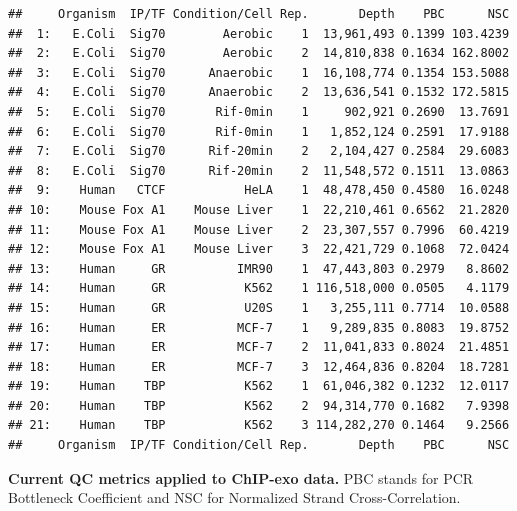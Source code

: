 \documentclass{bmcart}\usepackage[]{graphicx}\usepackage[]{color}
\makeatletter
\newenvironment{kframe}{%
 \def\at@end@of@kframe{}%
 \ifinner\ifhmode%
  \def\at@end@of@kframe{\end{minipage}}%
  \begin{minipage}{\columnwidth}%
 \fi\fi%
 \def\FrameCommand##1{\hskip\@totalleftmargin \hskip-\fboxsep
 \colorbox{shadecolor}{##1}\hskip-\fboxsep
     \hskip-\linewidth \hskip-\@totalleftmargin \hskip\columnwidth}%
 \MakeFramed {\advance\hsize-\width
   \@totalleftmargin\z@ \linewidth\hsize
   \@setminipage}}%
 {\par\unskip\endMakeFramed%
 \at@end@of@kframe}
\newenvironment{knitrout}{}{} %
\makeatother
\begin{document}
\begin{table}[h!]
  \centering


\begin{knitrout}
\color{fgcolor}\begin{kframe}
\begin{verbatim}
##     Organism  IP/TF Condition/Cell Rep.       Depth    PBC      NSC
##  1:   E.Coli  Sig70        Aerobic    1  13,961,493 0.1399 103.4239
##  2:   E.Coli  Sig70        Aerobic    2  14,810,838 0.1634 162.8002
##  3:   E.Coli  Sig70      Anaerobic    1  16,108,774 0.1354 153.5088
##  4:   E.Coli  Sig70      Anaerobic    2  13,636,541 0.1532 172.5815
##  5:   E.Coli  Sig70       Rif-0min    1     902,921 0.2690  13.7691
##  6:   E.Coli  Sig70       Rif-0min    1   1,852,124 0.2591  17.9188
##  7:   E.Coli  Sig70      Rif-20min    2   2,104,427 0.2584  29.6083
##  8:   E.Coli  Sig70      Rif-20min    2  11,548,572 0.1511  13.0863
##  9:    Human   CTCF           HeLA    1  48,478,450 0.4580  16.0248
## 10:    Mouse Fox A1    Mouse Liver    1  22,210,461 0.6562  21.2820
## 11:    Mouse Fox A1    Mouse Liver    2  23,307,557 0.7996  60.4219
## 12:    Mouse Fox A1    Mouse Liver    3  22,421,729 0.1068  72.0424
## 13:    Human     GR          IMR90    1  47,443,803 0.2979   8.8602
## 14:    Human     GR           K562    1 116,518,000 0.0505   4.1179
## 15:    Human     GR           U20S    1   3,255,111 0.7714  10.0588
## 16:    Human     ER          MCF-7    1   9,289,835 0.8083  19.8752
## 17:    Human     ER          MCF-7    2  11,041,833 0.8024  21.4851
## 18:    Human     ER          MCF-7    3  12,464,836 0.8204  18.7281
## 19:    Human    TBP           K562    1  61,046,382 0.1232  12.0117
## 20:    Human    TBP           K562    2  94,314,770 0.1682   7.9398
## 21:    Human    TBP           K562    3 114,282,270 0.1464   9.2566
##     Organism  IP/TF Condition/Cell Rep.       Depth    PBC      NSC
\end{verbatim}
\end{kframe}
\end{knitrout}
\caption{\textbf{Current QC metrics applied to ChIP-exo data.} PBC
  stands for PCR Bottleneck Coefficient and NSC for Normalized Strand
  Cross-Correlation.}
  \label{tab:qc} %
\end{table}
\end{document}
